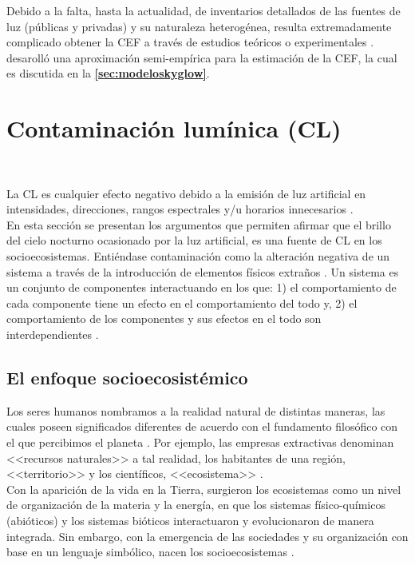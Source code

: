 Debido a la falta, hasta la actualidad, de inventarios detallados de las fuentes de luz (públicas y privadas) y su naturaleza heterogénea, resulta extremadamente complicado obtener la CEF a través de estudios teóricos o experimentales \citep{Kocifaj2014}. \cite{Garstang1986} desarolló una aproximación semi-empírica para la estimación de la CEF, la cual es discutida en la \textbf{\autoref{sec:modeloskyglow}}.

\newpage

\section{Contaminación lumínica (CL)}\\
\label{sec:contaminacionluminica}

La CL es cualquier efecto negativo debido a la emisión de luz artificial en intensidades, direcciones, rangos espectrales y/u horarios innecesarios \citep{AtlasREPSA,LibroCL,Stone2017}.\\

En esta sección se presentan los argumentos que permiten afirmar que el brillo del cielo nocturno ocasionado por la luz artificial, es una fuente de CL en los socioecosistemas. Entiéndase contaminación como la alteración negativa de un sistema a través de la introducción de elementos físicos extraños \citep{AtlasREPSA,LibroCL}. Un sistema es un conjunto de componentes interactuando en los que: 1) el comportamiento de cada componente tiene un efecto en el comportamiento del todo y, 2) el comportamiento de los componentes y sus efectos en el todo son interdependientes \citep{Avila2019}.\\

\subsection{El enfoque socioecosistémico}
\label{subsec:enfoquesocioecosistemico}

Los seres humanos nombramos a la realidad natural de distintas maneras, las cuales poseen significados diferentes de acuerdo con el fundamento filosófico con el que percibimos el planeta \citep{Avila2019}. Por ejemplo, las empresas extractivas denominan <<recursos naturales>> a tal realidad, los habitantes de una región, <<territorio>> y los científicos, <<ecosistema>> \citep{Uribe2014}.\\

Con la aparición de la vida en la Tierra, surgieron los ecosistemas como un nivel de organización de la materia y la energía, en que los sistemas físico-químicos (abióticos) y los sistemas bióticos interactuaron y evolucionaron de manera integrada. Sin embargo, con la emergencia de las sociedades y su organización con base en un lenguaje simbólico, nacen los socioecosistemas \citep{Avila2019,Uribe2014,Urquiza2015}.\\

